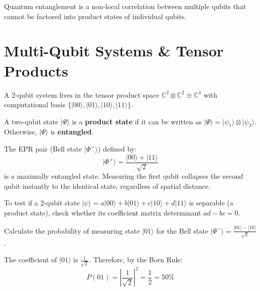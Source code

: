 \documentclass[mode=notes, palette=midnight, fontsize=11pt]{modernclassnotes}
\begin{document}
\newpage


Quantum entanglement is a non-local correlation between multiple qubits that cannot be factored into product states of individual qubits.

\section{Multi-Qubit Systems \& Tensor Products}

A 2-qubit system lives in the tensor product space $\mathbb{C}^2 \otimes \mathbb{C}^2 \cong \mathbb{C}^4$ with computational basis $\{|00\rangle, |01\rangle, |10\rangle, |11\rangle\}$.

\begin{definition}
A two-qubit state $|\Psi\rangle$ is a \textbf{product state} if it can be written as $|\Psi\rangle = |\psi_1\rangle \otimes |\psi_2\rangle$. Otherwise, $|\Psi\rangle$ is \textbf{entangled}.
\end{definition}

\begin{theorem}
The EPR pair (Bell state $|\Phi^+\rangle$) defined by:
\[
|\Phi^+\rangle = \frac{|00\rangle + |11\rangle}{\sqrt{2}}
\]
is a maximally entangled state. Measuring the first qubit collapses the second qubit instantly to the identical state, regardless of spatial distance.
\end{theorem}

\begin{tip}
To test if a 2-qubit state $|\psi\rangle = a|00\rangle + b|01\rangle + c|10\rangle + d|11\rangle$ is separable (a product state), check whether its coefficient matrix determinant $ad - bc = 0$.
\end{tip}

\begin{exercise}
Calculate the probability of measuring state $|01\rangle$ for the Bell state $|\Psi^-\rangle = \frac{|01\rangle - |10\rangle}{\sqrt{2}}$.
\end{exercise}

\begin{solution}
The coefficient of $|01\rangle$ is $\frac{1}{\sqrt{2}}$. Therefore, by the Born Rule:
\[
P(01) = \left| \frac{1}{\sqrt{2}} \right|^2 = \frac{1}{2} = 50\%
\]
\end{solution}
\end{document}
